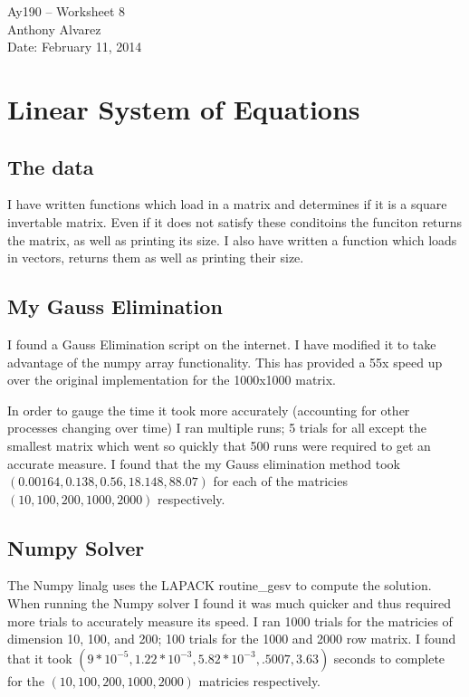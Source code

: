 \documentclass[11pt,letterpaper]{article}
\begin{document}
\begin{center}
\Large
Ay190 -- Worksheet 8\\
Anthony Alvarez\\
Date: February 11, 2014
\end{center}

\section{Linear System of Equations}
\subsection{The data}

I have written functions which load in a matrix and determines if it is a square
invertable matrix. Even if it does not satisfy these conditoins the funciton
returns the matrix, as well as printing its size. I also have written a function
which loads in vectors, returns them as well as printing their size. 

\subsection{My Gauss Elimination}
I found a Gauss Elimination script on the internet. I have modified it to take
advantage of the numpy array functionality. This has provided a 55x speed up 
over the original implementation for the 1000x1000 matrix. 

In order to gauge the time it took more accurately (accounting for other 
processes changing over time) I ran multiple runs; 5 trials for all except the 
smallest matrix which went so quickly that 500 runs were required to get an 
accurate measure. I found that the my Gauss elimination method took 
$(0.00164, 0.138, 0.56, 18.148, 88.07)$ for each of the matricies $(10, 100, 200,
1000,2000)$ respectively. 

\subsection{Numpy Solver}

The Numpy linalg uses the LAPACK routine\_gesv to compute the solution. When
running the Numpy solver I found it was much quicker and thus required more
trials to accurately measure its speed. I ran 1000 trials for the matricies of
dimension 10, 100, and 200; 100 trials for the 1000 and 2000 row matrix. I 
found that it took $(9*10^{-5}, 1.22*10^{-3}, 5.82*10^{-3}, .5007, 3.63)$
seconds to complete for the $(10, 100, 200, 1000,2000)$ matricies respectively. 
\end{document}
